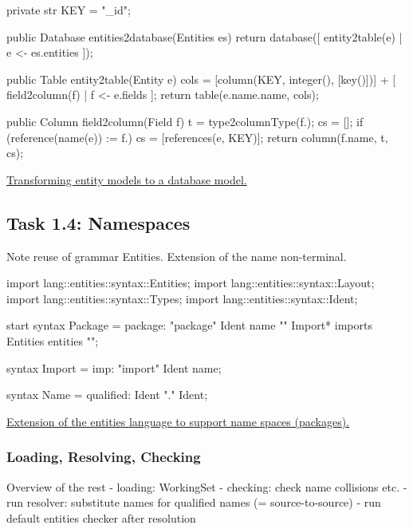 \documentclass[a4paper]{article}
\def\source#1#2{\href{http://svn.rascal-mpl.org/lwc/trunk/lwc11/src/#1}{#2}}
\begin{document}
\begin{listing}
\begin{rascal}
private str KEY = "_id";

public Database entities2database(Entities es) {
    return database([ entity2table(e) | e <- es.entities ]);
}

public Table entity2table(Entity e) {
    cols = [column(KEY, integer(), [key()])] 
         + [ field2column(f) | f <- e.fields ];
    return table(e.name.name, cols); 
}

public Column field2column(Field f) {
    t = type2columnType(f.\type);
    cs = [];
    if (reference(name(e)) := f.\type) {
        cs = [references(e, KEY)];
    }
    return column(f.name, t, cs);
}
\end{rascal}
\caption{\source{lang/entities/transform/Entities2Database.rsc}{Transforming
  entity models to a database model.}}\label{LST:entities2database}
\end{listing}

\subsection*{Task 1.4: Namespaces}

Note reuse of grammar Entities. Extension of the name non-terminal.

\begin{listing}
\begin{rascal}
import lang::entities::syntax::Entities;
import lang::entities::syntax::Layout;
import lang::entities::syntax::Types;
import lang::entities::syntax::Ident;

start syntax Package
    = package: "package" Ident name "{" 
                       Import* imports 
                       Entities entities 
                "}";

syntax Import = imp: "import" Ident name;

syntax Name = qualified: Ident "." Ident;
\end{rascal}
\caption{\source{lang/packages/syntax/Packages}{Extension of the
    entities language to support name spaces
    (packages).}\label{LST:packages}} 
\end{listing}

\subsubsection{Loading, Resolving, Checking}
Overview of the rest
- loading: WorkingSet
- checking: check name collisions etc.
- run resolver: substitute names for qualified names (= source-to-source)
- run default entities checker after resolution
\end{document}
